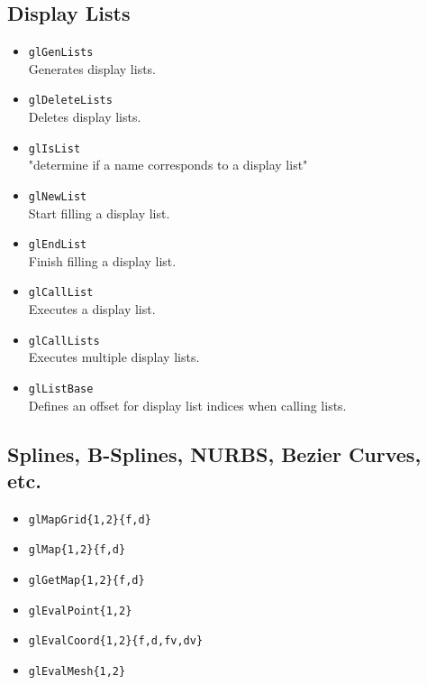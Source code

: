 \documentclass[12pt]{article}
\begin{document}
\subsection{Display Lists}
\begin{itemize}
\item \texttt{glGenLists} \\
	Generates display lists.
\item \texttt{glDeleteLists} \\
	Deletes display lists.
\item \texttt{glIsList} \\
	"determine if a name corresponds to a display list"
\item \texttt{glNewList} \\
	Start filling a display list.
\item \texttt{glEndList} \\
	Finish filling a display list.
\item \texttt{glCallList} \\
	Executes a display list.
\item \texttt{glCallLists} \\
	Executes multiple display lists.
\item \texttt{glListBase} \\
	Defines an offset for display list indices when calling lists.
\end{itemize}




\subsection{Splines, B-Splines, NURBS, Bezier Curves, etc.}
\begin{itemize}
\item \texttt{glMapGrid\{1,2\}\{f,d\}}
\item \texttt{glMap\{1,2\}\{f,d\}}
\item \texttt{glGetMap\{1,2\}\{f,d\}}
\item \texttt{glEvalPoint\{1,2\}}
\item \texttt{glEvalCoord\{1,2\}\{f,d,fv,dv\}}
\item \texttt{glEvalMesh\{1,2\}}
\end{itemize}
\end{document}
